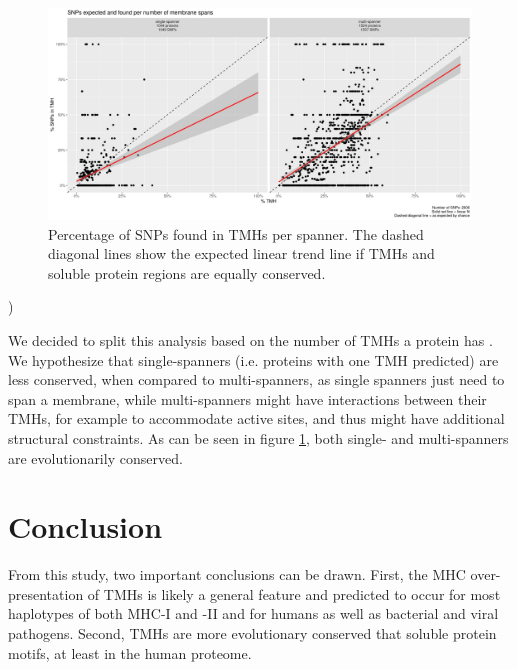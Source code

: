 \begin{figure}[!htbp]
  \includegraphics[width=\textwidth]{ncbi_peregrine_results/fig_f_snps_found_and_expected_per_spanner.png}
  \caption{
    Percentage of SNPs found in TMHs per spanner.
    The dashed diagonal lines show the expected linear trend line
    if TMHs and soluble protein regions are equally conserved.
  }
  \label{fig:f_snps_found_and_expected_per_spanner}
\end{figure}
)

We decided to split this analysis based on the number of TMHs
a protein has . We hypothesize that single-spanners (i.e. proteins
with one TMH predicted) are less conserved, when compared to multi-spanners,
as single spanners just need to span a membrane, while multi-spanners
might have interactions between their TMHs, 
for example to accommodate active sites, and 
thus might have additional structural constraints.
As can be seen in figure \ref{fig:f_snps_found_and_expected_per_spanner}, 
both single- and multi-spanners are evolutionarily conserved.

\section{Conclusion}


From this study, two important conclusions can be drawn. 
First, the MHC over-presentation of TMHs is likely a general feature 
and predicted to occur for most haplotypes of both MHC-I and -II 
and for humans as well as bacterial and viral pathogens. 
Second, TMHs are more evolutionary conserved that soluble protein motifs, 
at least in the human proteome. 

